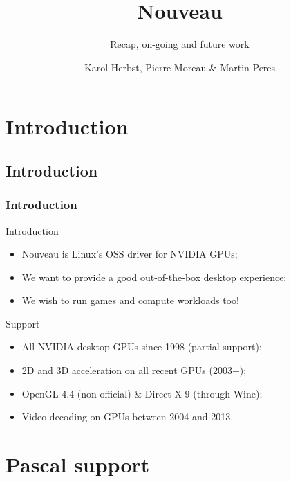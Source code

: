 \documentclass[11pt,english,compress]{beamer}
\title{Nouveau}
\subtitle{Recap, on-going and future work}
\author{Karol Herbst, Pierre Moreau \& Martin Peres}
\institute{Nouveau developers}
\begin{document}

\begin{frame}
	\titlepage
\end{frame}

\section{Introduction}
\subsection*{Introduction}
\begin{frame}
	\frametitle{Introduction}

	\begin{block}{Introduction}
		\begin{itemize}
			\item Nouveau is Linux's OSS driver for NVIDIA GPUs;
			\item We want to provide a good out-of-the-box desktop experience;
			\item We wish to run games and compute workloads too!
		\end{itemize}
	\end{block}

	\pause

	\begin{block}{Support}
		\begin{itemize}
			\item All NVIDIA desktop GPUs since 1998 (partial support);
			\item 2D and 3D acceleration on all recent GPUs (2003+);
			\item OpenGL 4.4 (non official) \& Direct X 9 (through Wine);
			\item Video decoding on GPUs between 2004 and 2013.
		\end{itemize}
	\end{block}
\end{frame}

\section{Pascal support}
\end{document}
